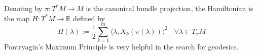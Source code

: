 \documentclass[11pt,twoside,a4paper]{article}
\newcommand{\red}{\color{red}}
\newcommand*\diff{\mathop{}\!\mathrm{d}}
\newcommand{\R}{\mathbb{R}}
\newcommand{\T}{\mathrm T}
\theoremstyle{theorem}
\theoremstyle{definition}
\theoremstyle{remark}
\theoremstyle{proof}
\begin{document}


Denoting by $\pi: T^\ast M \to M$ is the canonical bundle projection, the Hamiltonian is the map $H : T^*M \to \R$ defined by
\[
H(\lambda) :=  \frac{1}{2}\sum_{k = 1}^m \langle \lambda, X_k(\pi(\lambda)) \rangle^2 ~~~~\forall \lambda\in T_xM
\]
Pontryagin's Maximum Principle is very helpful in the search for
geodesics.
\end{document}
